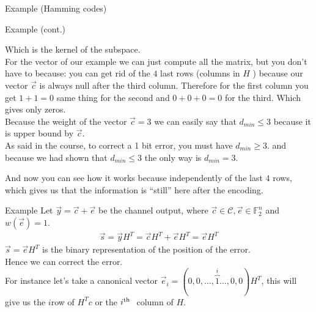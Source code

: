 \begin{parag}{Example (Hamming codes)}
\begin{subparag}{Example (cont.)}
\begin{framedremark}
                Which is the kernel of the subspace.\\
                For the vector of our example we can just compute all the matrix, but you don't have to because: you can get rid of the $4$ last rows (columns in $H$ ) because our vector $\vec{c}$ is always null after the third column. Therefore for the first column you get $1 + 1 = 0$ same thing for the second and $0 + 0 + 0 = 0$ for the third. Which gives only zeros.\\
                Because the weight of the vector $\vec{c} =  3$ we can easily say that $d_{min} \leq 3$ because it is upper bound by $\vec{c}$.\\
                As said in the course, to correct a 1 bit error, you must have $d_{min} \geq 3$. and because we had shown that $d_{min} \leq 3$ the only way is $d_{min} =  3$.
            \end{framedremark}
            \begin{framedremark}
            And now you can see how it works because independently of the last $4$ rows, which gives us that the information is ``still'' here after the encoding.
            \end{framedremark}
        \end{subparag}
        \begin{subparag}{Example}
            Let $\vec{y} =  \vec{c} + \vec{e}$ be the channel output, where $\vec{c} \in \mathcal{C}, \vec{e} \in \mathbb{F}_2^n$ and $w\left(\vec{e}\right) =  1$.\\
           \begin{align*} \vec{s} =  \vec{y}H^T = \vec{c}H^T + \vec{e}H^T =  \vec{e}H^T \end{align*}
           $\vec{s} =  \vec{e}H^T$ is the binary representation of the position of the error.\\
           Hence we can correct the error.\\
           For instance let's take a canonical vector $\vec{e}_i =  \left(0, 0, \ldots, \overbrace{1}^{i}\ldots, 0, 0\right)H^T$, this will give us the $i$\Th row of $H^Tc$ or the $i\textsuperscript{th}\ $ column of $H$. 
        \end{subparag}
        
    \end{parag}

